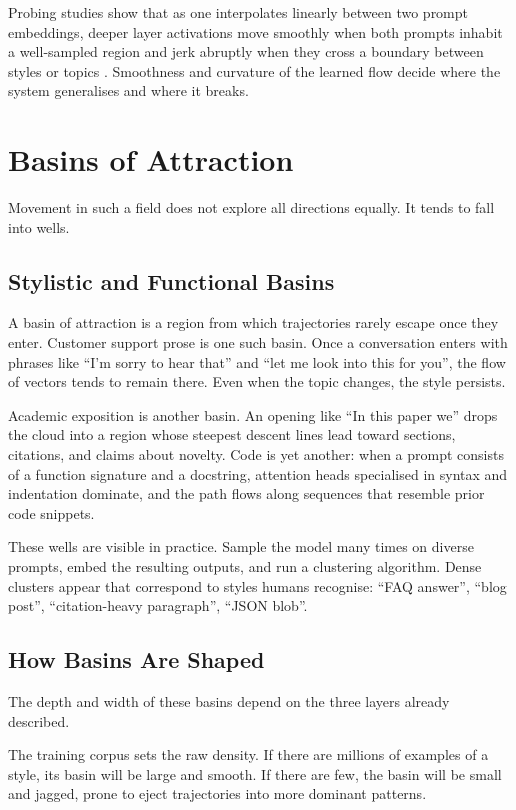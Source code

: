 \documentclass[12pt,a4paper]{article}
\begin{document}
Probing studies show that as one interpolates linearly between two prompt embeddings, deeper layer activations move smoothly when both prompts inhabit a well-sampled region and jerk abruptly when they cross a boundary between styles or topics \cite{bowman2016generating}. Smoothness and curvature of the learned flow decide where the system generalises and where it breaks.

\section{Basins of Attraction}

Movement in such a field does not explore all directions equally. It tends to fall into wells.

\subsection{Stylistic and Functional Basins}

A basin of attraction is a region from which trajectories rarely escape once they enter. Customer support prose is one such basin. Once a conversation enters with phrases like ``I'm sorry to hear that'' and ``let me look into this for you'', the flow of vectors tends to remain there. Even when the topic changes, the style persists.

Academic exposition is another basin. An opening like ``In this paper we'' drops the cloud into a region whose steepest descent lines lead toward sections, citations, and claims about novelty. Code is yet another: when a prompt consists of a function signature and a docstring, attention heads specialised in syntax and indentation dominate, and the path flows along sequences that resemble prior code snippets.

These wells are visible in practice. Sample the model many times on diverse prompts, embed the resulting outputs, and run a clustering algorithm. Dense clusters appear that correspond to styles humans recognise: ``FAQ answer'', ``blog post'', ``citation-heavy paragraph'', ``JSON blob''.

\subsection{How Basins Are Shaped}

The depth and width of these basins depend on the three layers already described.

The training corpus sets the raw density. If there are millions of examples of a style, its basin will be large and smooth. If there are few, the basin will be small and jagged, prone to eject trajectories into more dominant patterns.
\end{document}
